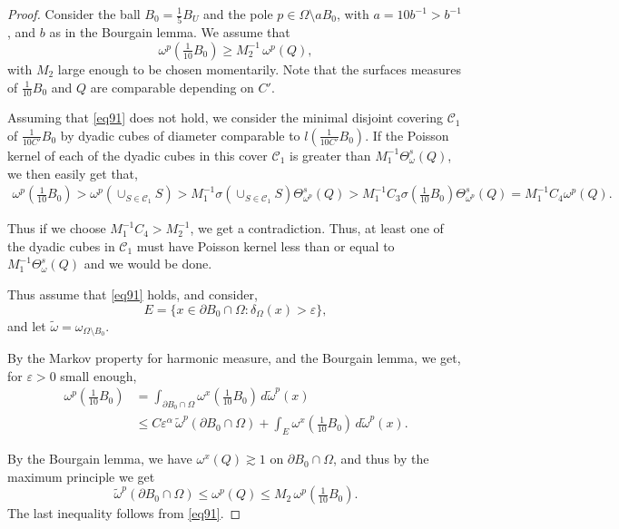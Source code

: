 \documentclass{article}
\newcounter{lem}
\theoremstyle{plain}
\theoremstyle{plain}
\theoremstyle{definition}
\theoremstyle{plain}
\begin{document}
\begin{proof} Consider the ball $B_0 = \frac{1}{5}B_U$ and the pole $p \in \Omega \setminus aB_0$,
with $a = 10 b^{-1} > b^{-1}$, and $b$ as in the Bourgain lemma.
We assume that
\begin{equation}\label{eq91}
\omega^p\!\left(\tfrac{1}{10} B_0\right) \ge M_2^{-1} \, \omega^p(Q),
\end{equation}
with $M_2$ large enough to be chosen momentarily. Note that the surfaces measures of $\frac{1}{10}B_0$ and $Q$ are comparable depending on $C'$.

Assuming that \cref{eq91} does not hold, we consider the minimal disjoint covering $\mathcal{C}_1$ of $\frac{1}{10C'}B_0$ by dyadic cubes of diameter comparable to $l(\frac{1}{10C'}B_0)$. If the Poisson kernel of each of the dyadic cubes in this cover $\mathcal{C}_1$ is greater than $M^{-1}_1 \Theta^s_\omega(Q)$, we then easily get that,
\begin{align}
    \omega^{p}(\frac{1}{10}B_0)>\omega^{p}(\cup_{S\in \mathcal{C}_1} S) > M^{-1}_1\sigma(\cup_{S\in \mathcal{C}_1} S) \Theta^s_{\omega^{p}}(Q)>M^{-1}_1 C_3\sigma(\frac{1}{10}B_0) \Theta^s_{\omega^{p}}(Q)=M_{1}^{-1}C_4 \omega^{p}(Q).
\end{align}

Thus if we choose $M^{-1}_1 C_4>M^{-1}_2$, we get a contradiction. Thus, at least one of the dyadic cubes in $\mathcal{C}_1$ must have Poisson kernel less than or equal to $M^{-1}_1 \Theta^s_\omega(Q)$ and we would be done. 

Thus assume that \cref{eq91} holds, and consider,
\[
E = \{ x \in \partial B_0 \cap \Omega : \delta_\Omega(x) > \varepsilon \},
\]
and let $\widetilde{\omega} = \omega_{\Omega\setminus B_0}$.

By the Markov property for harmonic measure, and the
Bourgain lemma, we get, for $\varepsilon > 0$ small enough,
\begin{align*}
\omega^p\!\left(\tfrac{1}{10} B_0\right)
&= \int_{\partial B_0 \cap \Omega} \omega^x\!\left(\tfrac{1}{10} B_0\right)
\, d\widetilde{\omega}^p(x) \\
&\le C \varepsilon^{\alpha} \, \widetilde{\omega}^p(\partial B_0 \cap \Omega)
   + \int_E \omega^x\!\left(\tfrac{1}{10} B_0\right) \, d\widetilde{\omega}^p(x).
\end{align*}

By the Bourgain lemma, we have $\omega^x(Q) \gtrsim 1$ on
$\partial B_0 \cap \Omega$, and thus by the maximum principle we get
\[
\widetilde{\omega}^p(\partial B_0 \cap \Omega)
\le \omega^p(Q)
\le M_2 \, \omega^p\!\left(\tfrac{1}{10} B_0\right).
\]
The last inequality follows from \cref{eq91}.


\end{proof}
\end{document}
